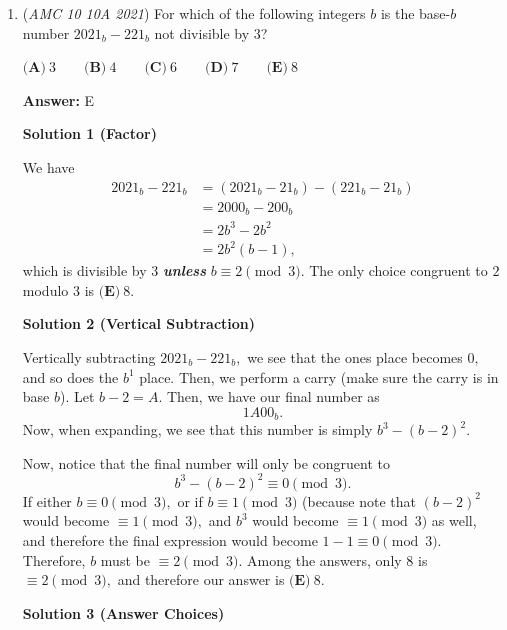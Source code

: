 \begin{enumerate}
 -Education the Study of Everything

 
            \begin{itemize}
        \item This video is currently private
            \end{itemize}
            


	\item (\textit{AMC 10 10A 2021}) For which of the following integers $b$ is the base-$b$ number $2021_b - 221_b$ not divisible by $3$?


 $\textbf{(A)} ~3 \qquad\textbf{(B)} ~4\qquad\textbf{(C)} ~6\qquad\textbf{(D)} ~7\qquad\textbf{(E)} ~8$

 \textbf{Answer: }E



\textbf{Solution 1 (Factor)}

We have 
 \begin{align*} 2021_b - 221_b &= (2021_b - 21_b) - (221_b - 21_b) \\ &= 2000_b - 200_b \\ &= 2b^3 - 2b^2 \\ &= 2b^2(b-1), \end{align*}
which is divisible by $3$ \textbf{\textit{unless}} $b\equiv2\pmod{3}.$ The only choice congruent to $2$ modulo $3$ is $\boxed{\textbf{(E)} ~8}.$




\textbf{Solution 2 (Vertical Subtraction)}

Vertically subtracting $2021_b - 221_b,$ we see that the ones place becomes $0,$ and so does the $b^1$ place. Then, we perform a carry (make sure the carry is in base $b$). Let $b-2 = A.$ Then, we have our final number as 
 \[1A00_b.\]Now, when expanding, we see that this number is simply $b^3 - (b - 2)^2.$

 Now, notice that the final number will only be congruent to 
 \[b^3-(b-2)^2\equiv0\pmod{3}.\] If either $b\equiv0\pmod{3},$ or if $b\equiv1\pmod{3}$ (because note that $(b - 2)^2$ would become $\equiv1\pmod{3},$ and $b^3$ would become $\equiv1\pmod{3}$ as well, and therefore the final expression would become $1-1\equiv0\pmod{3}.$ Therefore, $b$ must be $\equiv2\pmod{3}.$ Among the answers, only $8$ is $\equiv2\pmod{3},$ and therefore our answer is $\boxed{\textbf{(E)} ~8}.$




\textbf{Solution 3 (Answer Choices)}


\end{enumerate}
